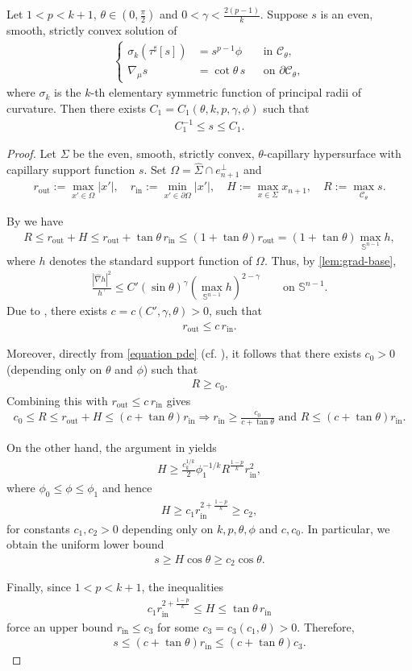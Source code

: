 \documentclass[12pt]{amsart}
\numberwithin{equation}{section}
\newcommand{\wh}{\widehat}
\newcommand{\8}{\infty}
\newcommand{\Si}{\Sigma}
\newcommand{\cC}{\mathcal{C}}
\newcommand{\eq}[1]{\begin{equation}\begin{alignedat}{2}#1\end{alignedat}\end{equation}}
\newcommand{\Cth}{\cC_\theta}
\begin{document}
\begin{thm}
Let $1<p<k+1$, $\theta\in (0,\frac{\pi}{2})$ and $0<\gamma<\frac{2(p-1)}{k}$. Suppose $s$ is an even, smooth, strictly convex solution of
\eq{\label{equation pde}
\left\{
\begin{aligned}
 \sigma_k(\tau^\sharp[s])&=s^{p-1}\phi
    &&\text{in }\Cth,\\
  \nabla_\mu s &= \cot\theta\,s
    &&\text{on }\partial\Cth,
\end{aligned}
\right.
}
where $\sigma_k$ is the $k$-th elementary symmetric function of principal radii of curvature. Then there exists $C_1=C_1(\theta,k,p,\gamma,\phi)$ such that
\eq{
C_1^{-1}\leq s\leq C_1.
}
\end{thm} 
\begin{proof}
Let $\Sigma$ be the even, smooth, strictly convex, $\theta$-capillary hypersurface with capillary support function $s$.
Set $\Omega=\wh{\Si}\cap e_{n+1}^{\perp}$ and
\eq{
r_{\mathrm{out}}:=\max_{x'\in\Omega}|x'|,
\quad
r_{\mathrm{in}}:=\min_{x'\in\partial\Omega}|x'|,
\quad
H:=\max_{x\in \Sigma} x_{n+1},\quad R:=\max_{\Cth}s.
}

By \cite[Thm. 2.9]{HI25b} we have
\eq{
R \le r_{\mathrm{out}}+H
\le r_{\mathrm{out}}+\tan\theta\, r_{\mathrm{in}}
\le (1+\tan\theta) r_{\mathrm{out}}
=(1+\tan\theta) \max_{\mathbb{S}^{n-1}} h,
}
where $h$ denotes the standard support function of $\Omega$. Thus, by \autoref{lem:grad-base},
\eq{
\frac{|\wh{\nabla}h|^2}{h^\gamma}
\le C' (\sin\theta)^{\gamma} \left(\max_{\mathbb{S}^{n-1}} h\right)^{2-\gamma}
\qquad\text{on }\mathbb{S}^{n-1}.
}
Due to \cite[Lem. 3.1]{Gua22}, there exists $c=c(C',\gamma,\theta)>0$,
such that
\eq{
r_{\mathrm{out}}\le c\, r_{\mathrm{in}}.
}

Moreover, directly from \eqref{equation pde} (cf. \cite[Lem. 3.3]{HI25b}), it follows that there exists $c_0>0$ (depending only on $\theta$ and $\phi$) such that
\eq{
R\ge c_0.
}
Combining this with $r_{\mathrm{out}}\le c\,r_{\mathrm{in}}$  gives
\eq{
c_0\le R\le r_{\mathrm{out}}+H\le (c+\tan\theta)r_{\mathrm{in}}\Rightarrow
r_{\mathrm{in}}\ge \frac{c_0}{c+\tan\theta}  \text{ and } R\leq  (c+\tan\theta)r_{\mathrm{in}}.
}

On the other hand, the argument in \cite[Sec. 3.1]{HI25b} yields
\eq{
H\ge \frac{c_k^{1/k}}{2}\phi_1^{-1/k} R^{\frac{1-p}{k}} r_{\mathrm{in}}^2,
}
where $\phi_0\le \phi\le \phi_1$ and hence
\eq{
H\ge c_1 r_{\mathrm{in}}^{2+\frac{1-p}{k}}\ge c_2,
}
for constants $c_1,c_2>0$ depending only on $k,p,\theta,\phi$ and $c, c_0$.
In particular, we obtain the uniform lower bound
\eq{
s\ge H\cos\theta \ge c_2\cos\theta .
}

Finally, since $1<p<k+1$, the inequalities
\eq{
c_1 r_{\mathrm{in}}^{2+\frac{1-p}{k}}\le H\le \tan\theta\,r_{\mathrm{in}}
}
force an upper bound $r_{\mathrm{in}}\le c_3$ for some $c_3=c_3(c_1,\theta)>0$.
Therefore,
\eq{
s\le (c+\tan\theta)r_{\mathrm{in}}\le (c+\tan\theta)c_3.
}
\end{proof}
\end{document}
